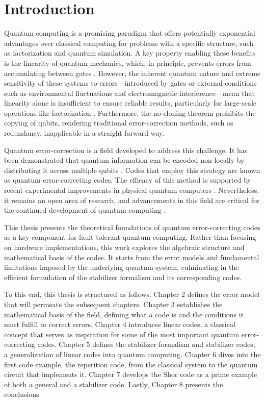 \chapter{Introduction}

Quantum computing is a promising paradigm that offers potentially exponential advantages over classical computing for problems with a specific structure, such as factorization and quantum simulation. A key property enabling these benefits is the linearity of quantum mechanics, which, in principle, prevents errors from accumulating between gates \citep{Kitaev2002}. However, the inherent quantum nature and extreme sensitivity of these systems to errors—introduced by gates or external conditions such as environmental fluctuations and electromagnetic interference—mean that linearity alone is insufficient to ensure reliable results, particularly for large-scale operations like factorization \citep{Shor1996}. Furthermore, the no-cloning theorem prohibits the copying of qubits, rendering traditional error-correction methods, such as redundancy, inapplicable in a straight forward way.

Quantum error-correction is a field developed to address this challenge. It has been demonstrated that quantum information can be encoded non-locally by distributing it across multiple qubits \citep{Shor1996}. Codes that employ this strategy are known as quantum error-correcting codes. The efficacy of this method is supported by recent experimental improvements in physical quantum computers \citep{IBM2025}. Nevertheless, it remains an open area of research, and advancements in this field are critical for the continued development of quantum computing \citep{IBM2025}.

This thesis presents the theoretical foundations of quantum error-correcting codes as a key component for fault-tolerant quantum computing. Rather than focusing on hardware implementations, this work explores the algebraic structure and mathematical basis of the codes. It starts from the error models and fundamental limitations imposed by the underlying quantum system, culminating in the efficient formulation of the stabilizer formalism and its corresponding codes.

To this end, this thesis is structured as follows. Chapter 2 defines the error model that will permeate the subsequent chapters. Chapter 3 establishes the mathematical basis of the field, defining what a code is and the conditions it must fulfill to correct errors. Chapter 4 introduces linear codes, a classical concept that serves as inspiration for some of the most important quantum error-correcting codes. Chapter 5 defines the stabilizer formalism and stabilizer codes, a generalization of linear codes into quantum computing. Chapter 6 dives into the first code example, the repetition code, from the classical system to the quantum circuit that implements it. Chapter 7 develops the Shor code as a prime example of both a general and a stabilizer code. Lastly, Chapter 8 presents the conclusions.
